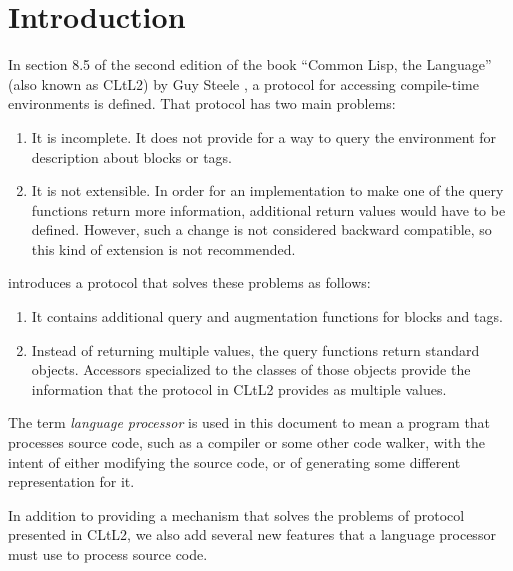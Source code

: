 \chapter{Introduction}
%

In section 8.5 of the second edition of the book ``Common Lisp, the
Language'' (also known as CLtL2) by Guy Steele
\cite{Steele:1990:CLL:95411}, a protocol for accessing compile-time
environments is defined.  That protocol has two main problems:

\begin{enumerate}
\item It is incomplete.  It does not provide for a way to query the
  environment for description about blocks or tags.
\item It is not extensible.  In order for an implementation to make
  one of the query functions return more information, additional
  return values would have to be defined.  However, such a change is
  not considered backward compatible, so this kind of extension is not
  recommended.
\end{enumerate}

\sysname{} introduces a protocol that solves these problems as
follows:

\begin{enumerate}
\item It contains additional query and augmentation functions for
  blocks and tags.
\item Instead of returning multiple values, the query functions return
  standard objects.  Accessors specialized to the classes of those
  objects provide the information that the protocol in CLtL2
  provides as multiple values.
\end{enumerate}

The term \emph{language processor} is used in this document to mean a
program that processes source code, such as a compiler or some other
code walker, with the intent of either modifying the source code, or
of generating some different representation for it.

In addition to providing a mechanism that solves the problems of
protocol presented in CLtL2, we also add several new features that
a language processor must use to process source code.
